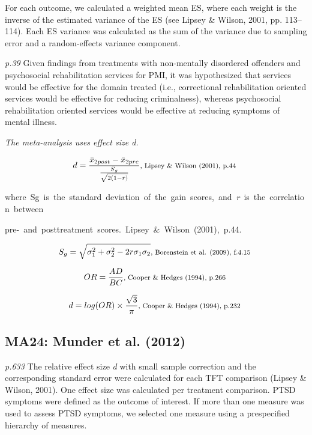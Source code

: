 \documentclass{article}
\begin{document}
For each outcome, we calculated a weighted mean ES, where each weight is the inverse of the estimated variance of the ES (see Lipsey \& Wilson, 2001, pp. 113–114). Each ES variance was calculated as the sum of the variance due to sampling error and a random-effects variance component.

\textit{p.39} Given findings from treatments with non-mentally disordered offenders and psychosocial rehabilitation services for PMI, it was hypothesized that services would be effective for the domain treated (i.e., correctional rehabilitation oriented services would be effective for reducing criminalness), whereas psychosocial rehabilitation oriented services would be effective at reducing symptoms of mental illness.

\vspace{3mm}
\textit{The meta-analysis uses effect size d.}

\begin{equation*}
d={\frac {{\bar{x}_{2post}}-{{\bar{x}_{2pre}}}}{\frac{S_{g}}{\sqrt{2(1-r)}}}}   \mbox {\footnotesize, Lipsey \& Wilson (2001), p.44 } 
\end{equation*}

\mbox {\footnotesize where Sg is the standard deviation of the gain scores, and \textit{r} is the correlation between }

\mbox {\footnotesize pre- and posttreatment scores. Lipsey \& Wilson (2001), p.44. }

\begin{equation*}
S_{g}= \sqrt{\sigma^{2}_{1} + \sigma^{2}_{2} - 2r\sigma_{1}\sigma_{2}} \mbox{\footnotesize,  Borenstein et al. (2009), f.4.15  } 
\end{equation*}

\begin{equation*}
OR={\frac {AD}{BC}} \mbox{\footnotesize, Cooper \& Hedges (1994), p.266 }
\end{equation*}

\begin{equation*}
d=log(OR) \times {\frac {\sqrt{3}}{\pi}} \mbox{\footnotesize, Cooper \& Hedges (1994), p.232 }
\end{equation*}

\subsection*{MA24: Munder et al. (2012)}

\textit{p.633} The relative effect size \textit{d} with small sample correction and the corresponding standard error were calculated for each TFT comparison (Lipsey \& Wilson, 2001). One effect size was calculated per treatment comparison. PTSD symptoms were defined as the outcome of interest. If more than one measure was used to assess PTSD symptoms, we selected one measure using a prespecified hierarchy of measures.
\end{document}
